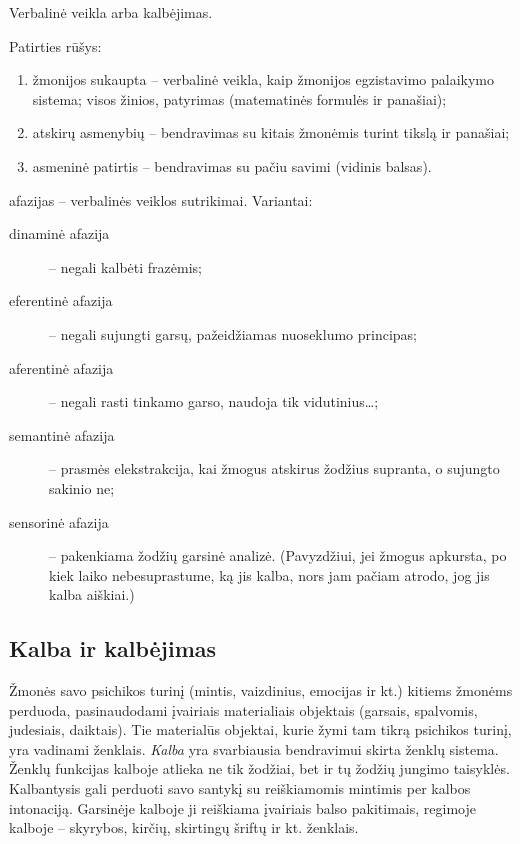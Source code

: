 Verbalinė veikla arba kalbėjimas.

Patirties rūšys:
\begin{enumerate}
  \item žmonijos sukaupta – verbalinė veikla, kaip žmonijos egzistavimo 
    palaikymo sistema; visos žinios, patyrimas (matematinės formulės
    ir panašiai);
  \item atskirų asmenybių – bendravimas su kitais žmonėmis turint tikslą
    ir panašiai;
  \item asmeninė patirtis – bendravimas su pačiu savimi (vidinis balsas).
\end{enumerate}

\Glspl{afazija} – verbalinės veiklos sutrikimai. Variantai:
\begin{description}
  \item[dinaminė afazija] – negali kalbėti frazėmis;
  \item[eferentinė afazija] – negali sujungti garsų, pažeidžiamas nuoseklumo
    principas;
  \item[aferentinė afazija] – negali rasti tinkamo garso, naudoja tik
    vidutinius…; %
  \item[semantinė afazija]  – prasmės elekstrakcija, 
    kai žmogus atskirus žodžius supranta, o sujungto sakinio ne;
  \item[sensorinė afazija] – pakenkiama žodžių garsinė analizė. (Pavyzdžiui,
    jei žmogus apkursta, po kiek laiko nebesuprastume, ką jis kalba, nors
    jam pačiam atrodo, jog jis kalba aiškiai.)
\end{description}


\label{tema:kalba_ir_kalbejimas}

\subsection{Kalba ir kalbėjimas}

Žmonės savo psichikos turinį (mintis, vaizdinius, emocijas ir kt.)
kitiems žmonėms perduoda, pasinaudodami įvairiais materialiais objektais
(garsais, spalvomis, judesiais, daiktais). Tie materialūs objektai, kurie
žymi tam tikrą psichikos turinį, yra vadinami ženklais. \emph{Kalba} yra
svarbiausia bendravimui skirta ženklų sistema. Ženklų funkcijas kalboje
atlieka ne tik žodžiai, bet ir tų žodžių jungimo taisyklės. Kalbantysis 
gali perduoti savo santykį su reiškiamomis mintimis per kalbos intonaciją.
Garsinėje kalboje ji reiškiama įvairiais balso pakitimais, regimoje kalboje
– skyrybos, kirčių, skirtingų šriftų ir kt. ženklais.

